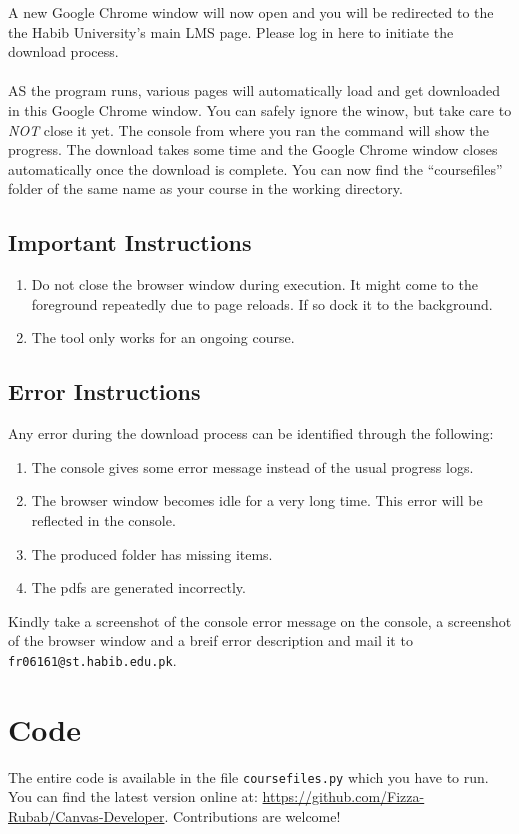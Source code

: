 \documentclass{article}
\begin{document}
A new Google Chrome window will now open and you will be redirected to
the the Habib University's main LMS page. Please log in here to initiate
the download process.
\\\\AS the program runs, various pages will automatically load and get
downloaded in this Google Chrome window. You can safely ignore the
winow, but take care to \emph{NOT} close it yet. The console from where
you ran the command will show the progress. The download takes some time
and the Google Chrome window closes automatically once the download is
complete. You can now find the ``coursefiles'' folder of the same name
as your course in the working directory.

\subsection{Important Instructions}

\begin{enumerate}
\def\labelenumi{\arabic{enumi}.}
\item
  Do not close the browser window during execution. It might come to the
  foreground repeatedly due to page reloads. If so dock it to the
  background.
\item
  The tool only works for an ongoing course.
\end{enumerate}

\subsection{Error Instructions}
Any error during the download process can be identified through the
following:

\begin{enumerate}
\def\labelenumi{\arabic{enumi}.}
\item
  The console gives some error message instead of the usual progress
  logs.
\item
  The browser window becomes idle for a very long time. This error will
  be reflected in the console.
\item
  The produced folder has missing items.
\item
  The pdfs are generated incorrectly.
\end{enumerate}

Kindly take a screenshot of the console error message on the console, a
screenshot of the browser window and a breif error description and mail
it to \texttt{fr06161@st.habib.edu.pk}.

\section{Code}

The entire code is available in the file \texttt{coursefiles.py} which
you have to run. You can find the latest version online at:
\url{https://github.com/Fizza-Rubab/Canvas-Developer}. Contributions are
welcome!
\end{document}
